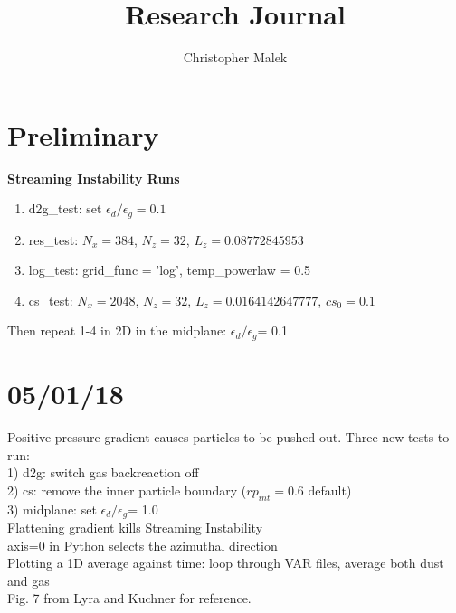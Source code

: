 \documentclass[10pt]{article}
\title{Research Journal}
\author{Christopher Malek}
\date{}
\newcommand{\edtog}{$\epsilon_{d}/\epsilon_{g}$}
\begin{document}
\maketitle
\section{Preliminary}
\textbf{Streaming Instability Runs}\\
\begin{enumerate}
\item d2g\_test: set $\epsilon_{d}/\epsilon_{g} = 0.1$\\
\item res\_test: $N_{x} = 384$, $N_{z} = 32$, $L_{z} = 0.08772845953$\\
\item log\_test: grid\_func = 'log', temp\_powerlaw = 0.5\\
\item cs\_test: $N_{x} = 2048$, $N_{z} = 32$, $L_{z} = 0.0164142647777$, $cs_{0} = 0.1$\\
\end{enumerate}
\noindent Then repeat 1-4 in 2D in the midplane: \edtog = 0.1
\section{05/01/18}
Positive pressure gradient causes particles to be pushed out. Three new tests to run:\\
1) d2g: switch gas backreaction off\\
2) cs: remove the inner particle boundary ($rp_{int}=0.6$ default)\\
3) midplane: set \edtog = 1.0\\

\noindent Flattening gradient kills Streaming Instability\\
axis=0 in Python selects the azimuthal direction\\

Plotting a 1D average against time: loop through VAR files, average both dust and gas\\
\* Fig. 7 from Lyra and Kuchner for reference.\\
\end{document}
